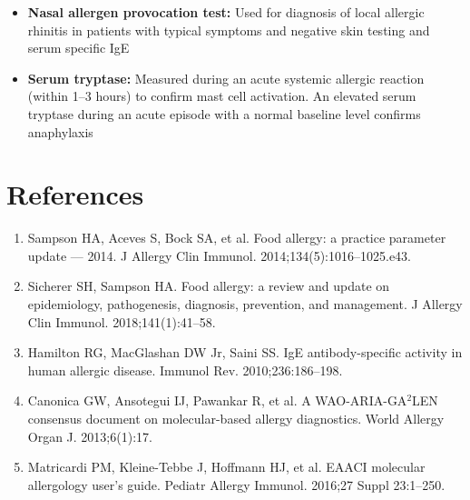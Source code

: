 \begin{itemize}
  \item \textbf{Nasal allergen provocation test:} Used for diagnosis of local allergic rhinitis in patients with typical symptoms and negative skin testing and serum specific IgE
  \item \textbf{Serum tryptase:} Measured during an acute systemic allergic reaction (within 1--3 hours) to confirm mast cell activation. An elevated serum tryptase during an acute episode with a normal baseline level confirms anaphylaxis
\end{itemize}

\section*{References}
\begin{enumerate}
  \item Sampson HA, Aceves S, Bock SA, et al. Food allergy: a practice parameter update --- 2014. J Allergy Clin Immunol. 2014;134(5):1016--1025.e43.
  \item Sicherer SH, Sampson HA. Food allergy: a review and update on epidemiology, pathogenesis, diagnosis, prevention, and management. J Allergy Clin Immunol. 2018;141(1):41--58.
  \item Hamilton RG, MacGlashan DW Jr, Saini SS. IgE antibody-specific activity in human allergic disease. Immunol Rev. 2010;236:186--198.
  \item Canonica GW, Ansotegui IJ, Pawankar R, et al. A WAO-ARIA-GA$^2$LEN consensus document on molecular-based allergy diagnostics. World Allergy Organ J. 2013;6(1):17.
  \item Matricardi PM, Kleine-Tebbe J, Hoffmann HJ, et al. EAACI molecular allergology user's guide. Pediatr Allergy Immunol. 2016;27 Suppl 23:1--250.
\end{enumerate}

\clearpage

